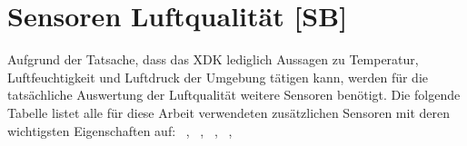 \section{Sensoren Luftqualität [SB]}\label{sec:Sensoren Luftqualität}
Aufgrund der Tatsache, dass das \acs{XDK} lediglich Aussagen zu Temperatur, Luftfeuchtigkeit und Luftdruck der Umgebung tätigen kann, werden für die tatsächliche Auswertung der Luftqualität weitere Sensoren benötigt. Die folgende Tabelle listet alle für diese Arbeit verwendeten zusätzlichen Sensoren mit deren wichtigsten Eigenschaften auf: \newline
~\cite{DataSheet.MQ7}, ~\cite{DataSheet.MG811}, ~\cite{DataSheet.MQ131}, ~\cite{DataSheet.MQ135}, ~\cite{DataSheet.SDS011}
\begin{table}[H]
	\begin{center}
	\end{center}
	\caption{Übersicht Sensoren}
	\label{tab:Sensoren}
\end{table}

